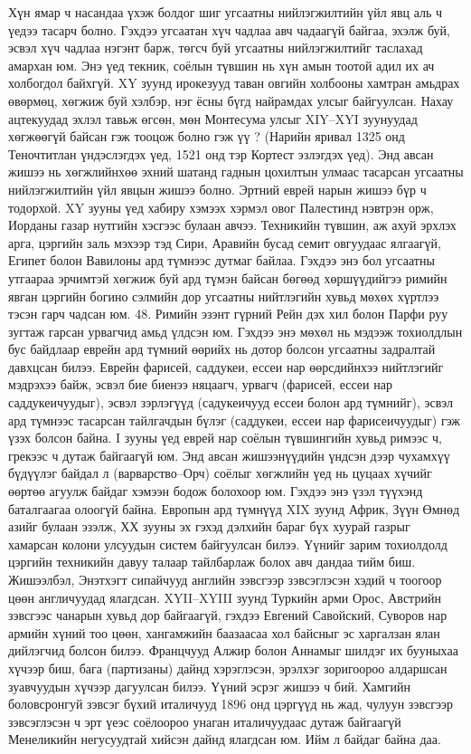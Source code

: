 Хүн ямар ч насандаа үхэж болдог шиг угсаатны нийлэгжилтийн үйл явц аль ч үедээ тасарч болно. Гэхдээ угсаатан хүч чадлаа авч чадаагүй байгаа, эхэлж буй, эсвэл хүч чадлаа нэгэнт барж, төгсч буй угсаатны нийлэгжилтийг таслахад амархан юм. Энэ үед текник, соёлын түвшин нь хүн амын тоотой адил их ач холбогдол байхгүй. XY зуунд ирокезууд таван овгийн холбооны хамтран амьдрах өвөрмөц, хөгжиж буй хэлбэр, нэг ёсны бүгд найрамдах улсыг байгуулсан. Нахау ацтекуудад эхлэл тавьж өгсөн, мөн Монтесума улсыг XIY–XYI зуунуудад хөгжөөгүй байсан гэж тооцож болно гэж үү ? (Нарийн яривал 1325 онд Теночтитлан үндэслэгдэх үед, 1521 онд тэр Кортест эзлэгдэх үед). Энд авсан жишээ нь хөгжлийнхөө эхний шатанд гаднын цохилтын улмаас тасарсан угсаатны нийлэгжилтийн үйл явцын жишээ болно.
Эртний еврей нарын жишээ бүр ч тодорхой. XY зууны үед хабиру хэмээх хэрмэл овог Палестинд нэвтрэн орж, Иорданы газар нутгийн хэсгээс булаан авчээ. Техникийн түвшин, аж ахуй эрхлэх арга, цэргийн заль мэхээр тэд Сири, Аравийн бусад семит овгуудаас ялгаагүй, Египет болон Вавилоны ард түмнээс дутмаг байлаа. Гэхдээ энэ бол угсаатны утгаараа эрчимтэй хөгжиж буй ард түмэн байсан бөгөөд хөршүүдийгээ римийн явган цэргийн богино сэлмийн дор угсаатны нийтлэгийн хувьд мөхөх хүртлээ тэсэн гарч чадсан юм. 48. Римийн эзэнт гүрний Рейн дэх хил болон Парфи руу зугтаж гарсан урвагчид амьд үлдсэн юм.
Гэхдээ энэ мөхөл нь мэдээж тохиолдлын бус байдлаар еврейн ард түмний өөрийх нь дотор болсон угсаатны задралтай давхцсан билээ. Еврейн фарисей, саддукеи, ессеи нар өөрсдийнхээ нийтлэгийг мэдрэхээ байж, эсвэл бие биенээ няцаагч, урвагч (фарисей, ессеи нар саддукеичуудыг), эсвэл зэрлэгүүд (садукеичууд ессеи болон ард түмнийг), эсвэл ард түмнээс тасарсан тайлгачдын бүлэг (саддукеи, ессеи нар фарисеичуудыг) гэж үзэх болсон байна. I зууны үед еврей нар соёлын түвшингийн хувьд римээс ч, грекээс ч дутаж байгаагүй юм.
Энд авсан жишээнүүдийн үндсэн дээр чухамхүү бүдүүлэг байдал л (варварство–Орч) соёлыг хөгжлийн үед нь цуцаах хүчийг өөртөө агуулж байдаг хэмээн бодож болохоор юм. Гэхдээ энэ үзэл түүхэнд баталгаагаа олоогүй байна. Европын ард түмнүүд XIX зуунд Африк, Зүүн Өмнөд азийг булаан эзэлж, ХХ зууны эх гэхэд дэлхийн бараг бүх хуурай газрыг хамарсан колони улсуудын систем байгуулсан билээ. Үүнийг зарим тохиолдолд цэргийн техникийн давуу талаар тайлбарлаж болох авч дандаа тийм биш. Жишээлбэл, Энэтхэгт сипайчууд английн зэвсгээр зэвсэглэсэн хэдий ч тоогоор цөөн англичуудад ялагдсан. XYII–XYIII зуунд Туркийн арми Орос, Австрийн зэвсгээс чанарын хувьд дор байгаагүй, гэхдээ Евгений Савойский, Суворов нар армийн хүний тоо цөөн, хангамжийн баазаасаа хол байсныг эс харгалзан ялан дийлэгчид болсон билээ. Францчууд Алжир болон Аннамыг шилдэг их бууныхаа хүчээр биш, бага (партизаны) дайнд хэрэглэсэн, эрэлхэг зоригоороо алдаршсан зуавчуудын хүчээр дагуулсан билээ. Үүний эсрэг жишээ ч бий. Хамгийн боловсронгуй зэвсэг бүхий италичууд 1896 онд цэргүүд нь жад, чулуун зэвсгээр зэвсэглэсэн ч эрт үеэс соёлоороо унаган италичуудаас дутаж байгаагүй Менеликийн негусуудтай хийсэн дайнд ялагдсан юм. Ийм л байдаг байна даа.
